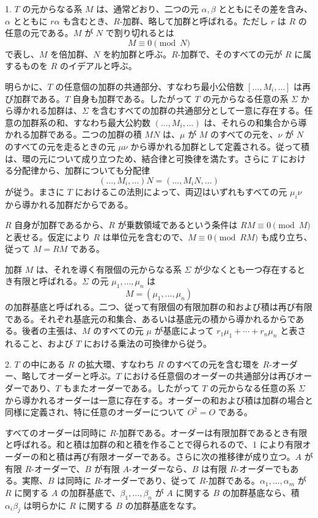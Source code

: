 \documentclass[11pt]{article}
\begin{document}
1. $T$ の元からなる系 $M$ は、通常どおり、二つの元 $\alpha,\beta$ とともにその差を含み、$\alpha$ とともに $r\alpha$ も含むとき、$R$-加群、略して加群と呼ばれる。ただし $r$ は $R$ の任意の元である。$M$ が $N$ で割り切れるとは
\[
        M\equiv 0 \pmod N
\]
で表し、$M$ を倍加群、$N$ を約加群と呼ぶ。$R$-加群で、そのすべての元が $R$ に属するものを $R$ のイデアルと呼ぶ。

明らかに、$T$ の任意個の加群の共通部分、すなわち最小公倍数 $[\ldots,M_i,\ldots]$ は再び加群である。$T$ 自身も加群である。したがって $T$ の元からなる任意の系 $\Sigma$ から導かれる加群は、$\Sigma$ を含むすべての加群の共通部分として一意に存在する。任意の加群系の和、すなわち最大公約数 $(\ldots,M_i,\ldots)$ は、それらの和集合から導かれる加群である。二つの加群の積 $MN$ は、$\mu$ が $M$ のすべての元を、$\nu$ が $N$ のすべての元を走るときの元 $\mu\nu$ から導かれる加群として定義される。従って積は、環の元について成り立つため、結合律と可換律を満たす。さらに $T$ における分配律から、加群についても分配律
\[
        (\ldots,M_i,\ldots)N=(\ldots,M_iN,\ldots)
\]
が従う。まさに $T$ におけるこの法則によって、両辺はいずれもすべての元 $\mu_i\nu$ から導かれる加群だからである。

$R$ 自身が加群であるから、$R$ が乗数領域であるという条件は $RM\equiv0\pmod M$ と表せる。仮定により $R$ は単位元を含むので、$M\equiv0\pmod{RM}$ も成り立ち、従って $M=RM$ である。

加群 $M$ は、それを導く有限個の元からなる系 $\Sigma$ が少なくとも一つ存在するとき有限と呼ばれる。$\Sigma$ の元 $\mu_1,\ldots,\mu_n$ は
\[
        M=(\mu_1,\ldots,\mu_n)
\]
の加群基底と呼ばれる。二つ、従って有限個の有限加群の和および積は再び有限である。それぞれ基底元の和集合、あるいは基底元の積から導かれるからである。後者の主張は、$M$ のすべての元 $\mu$ が基底によって $r_1\mu_1+\cdots+r_n\mu_n$ と表されること、および $T$ における乗法の可換律から従う。

2. $T$ の中にある $R$ の拡大環、すなわち $R$ のすべての元を含む環を $R$-オーダー、略してオーダーと呼ぶ。$T$ における任意個のオーダーの共通部分は再びオーダーであり、$T$ もまたオーダーである。したがって $T$ の元からなる任意の系 $\Sigma$ から導かれるオーダーは一意に存在する。オーダーの和および積は加群の場合と同様に定義され、特に任意のオーダーについて $O^2=O$ である。

すべてのオーダーは同時に $R$-加群である。オーダーは有限加群であるとき有限と呼ばれる。和と積は加群の和と積を作ることで得られるので、1 により有限オーダーの和と積は再び有限オーダーである。さらに次の推移律が成り立つ。$A$ が有限 $R$-オーダーで、$B$ が有限 $A$-オーダーなら、$B$ は有限 $R$-オーダーでもある。実際、$B$ は同時に $R$-オーダーであり、従って $R$-加群である。$\alpha_1,\ldots,\alpha_m$ が $R$ に関する $A$ の加群基底で、$\beta_1,\ldots,\beta_n$ が $A$ に関する $B$ の加群基底なら、積 $\alpha_i\beta_j$ は明らかに $R$ に関する $B$ の加群基底をなす。
\end{document}
